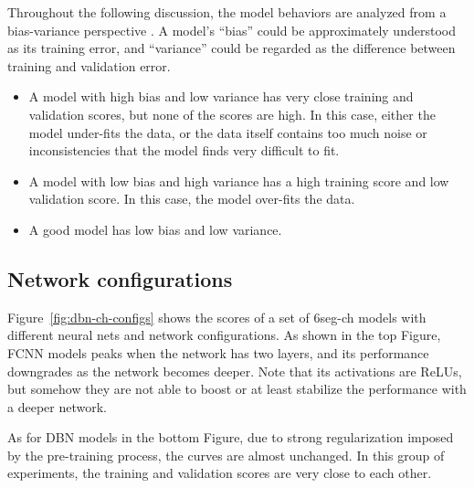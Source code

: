 Throughout the following discussion, the model behaviors are analyzed from a bias-variance perspective \cite{geman1992neural}. A model's ``bias'' could be approximately understood as its training error, and ``variance'' could be regarded as the difference between training and validation error.
\begin{itemize}
	\item A model with high bias and low variance has very close training and validation scores, but none of the scores are high. In this case, either the model under-fits the data, or the data itself contains too much noise or inconsistencies that the model finds very difficult to fit.
	\item A model with low bias and high variance has a high training score and low validation score. In this case, the model over-fits the data.
	\item A good model has low bias and low variance.
\end{itemize}

\subsection{Network configurations} \label{sec:3-p2}


Figure~\ref{fig:dbn-ch-configs} shows the scores of a set of 6seg-ch models with different neural nets and network configurations. As shown in the top Figure, FCNN models peaks when the network has two layers, and its performance downgrades as the network becomes deeper. Note that its activations are ReLUs, but somehow they are not able to boost or at least stabilize the performance with a deeper network.

As for DBN models in the bottom Figure, due to strong regularization imposed by the pre-training process, the curves are almost unchanged. In this group of experiments, the training and validation scores are very close to each other.

